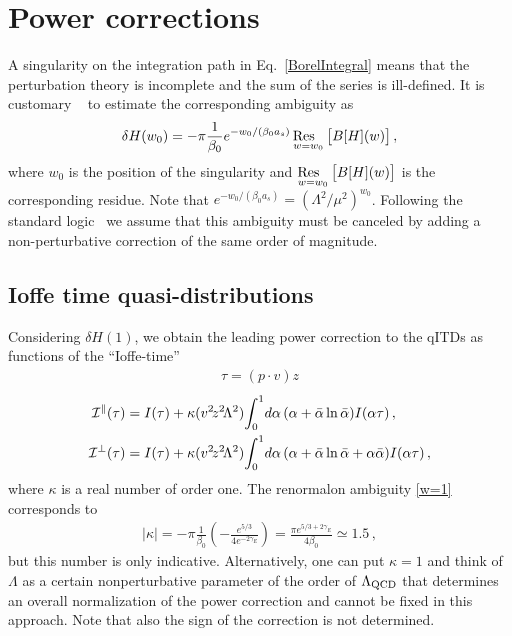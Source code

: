 \section{Power corrections}\label{sect_powercorrections}%
%

A singularity on the integration path in Eq.~\eqref{BorelIntegral} means that the perturbation theory is 
incomplete and the sum of the series is ill-defined. 
It is customary ~\cite{Beneke:1998ui} to estimate the corresponding ambiguity as
\begin{align}
\delta H(w_0)  = -\pi \frac{1}{\beta_0}  e^{-w_0/(\beta_0 a_s)} \operatorname*{\text{Res~~}}_{w=w_0}\big[B[H](w)\big]\,, 
\end{align}
where $w_0$ is the position of the singularity and $\displaystyle{\operatorname*{\text{Res~~}}_{w=w_0}\big[B[H](w)\big]}$ is the corresponding residue. Note that  $ e^{-w_0/(\beta_0 a_s)} = (\Lambda^2/\mu^2)^{w_0}$. Following the standard logic~\cite{Beneke:1998ui,Beneke:2000kc} we assume that this ambiguity must be 
canceled by adding a non-perturbative correction of the same order of magnitude. 

%
\subsection{Ioffe time quasi-distributions}\label{sect_qITD}%
%

Considering $\delta H(1)$, we obtain the leading power correction to the qITDs as functions of the ``Ioffe-time''
\begin{align}
 \tau = (p\cdot v) z 
\end{align}
\begin{align}
\label{t4-qITD}
  \mathcal{I}^\parallel(\tau) 
&= I(\tau) +
  \kappa (v^2\! z^2\!\Lambda^2)\! \int_0^1\!d\alpha \, (\alpha + \bar\alpha \ln \bar\alpha)I(\alpha \tau )\,,
\notag\\
  \mathcal{I}^\perp(\tau)
&= I(\tau) +
  \kappa (v^2\! z^2\!\Lambda^2) \!\int_0^1\!d\alpha \, (\alpha + \bar\alpha \ln \bar\alpha + \alpha\bar\alpha)I(\alpha \tau )\,,
\end{align}
where $\kappa$ is a real number of order one. The renormalon ambiguity \eqref{w=1} corresponds to 
\begin{align}
  |\kappa| = -\pi \frac{1}{\beta_0}\left(- \frac{ e^{5/3}}{4 e^{-2\gamma_E}}\right) = \frac{\pi e^{5/3+2\gamma_E}}{4 \beta_0} \simeq 1.5\,,  
\end{align} 
but this number is only indicative. Alternatively, one can put $\kappa=1$ and think of $\Lambda$ as a certain nonperturbative 
parameter of the order of $\Lambda_{\rm QCD}$ that determines an overall normalization of the power correction and 
cannot be fixed in this approach. Note that also the sign of the correction is not determined.

